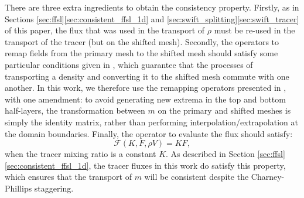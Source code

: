 \documentclass{ametsocV6.1}
\begin{document}
There are three extra ingredients to obtain the consistency property.
Firstly, as in Sections \ref{sec:ffsl}\ref{sec:consistent_ffsl_1d}  and \ref{sec:swift_splitting}\ref{sec:swift_tracer} of this paper, the flux that was used in the transport of $\rho$ must be re-used in the transport of the tracer (but on the shifted mesh).
Secondly, the operators to remap fields from the primary mesh to the shifted mesh should satisfy some particular conditions given in \citet{bendall2023solution}, which guarantee that the processes of transporting a density and converting it to the shifted mesh commute with one another.
In this work, we therefore use the remapping operators presented in \citet{bendall2023solution}, with one amendment: to avoid generating new extrema in the top and bottom half-layers, the transformation between $m$ on the primary and shifted meshes is simply the identity matrix, rather than performing interpolation/extrapolation at the domain boundaries.
Finally, the operator to evaluate the flux should satisfy:
\begin{equation}
\mathcal{F}(K,F,\rho V) = KF,
\end{equation}
when the tracer mixing ratio is a constant $K$.
As described in Section \ref{sec:ffsl}\ref{sec:consistent_ffsl_1d}, the tracer fluxes in this work do satisfy this property, which ensures that the transport of $m$ will be consistent despite the Charney-Phillips staggering.
\end{document}
